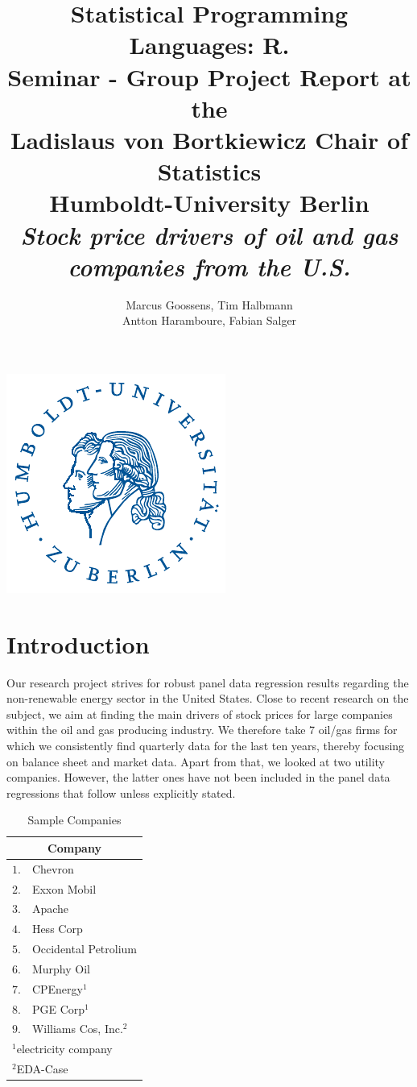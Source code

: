 \documentclass[a4paper]{article}
\title{Statistical Programming Languages: R. \\ Seminar - Group Project Report at the \\
Ladislaus von Bortkiewicz Chair of Statistics \\
Humboldt-University Berlin \\ \emph{Stock price drivers of oil and gas companies from the U.S.}}
\author{Marcus Goossens, Tim Halbmann \\ Antton Haramboure, Fabian Salger}
\begin{document}
\maketitle

\begin{center}
\includegraphics{hulogo.pdf}\\[0.75cm]
\end{center}

\newpage

\tableofcontents

\newpage

\section{Introduction}

Our research project strives for robust panel data regression results regarding the non-renewable energy sector in the United States. Close to recent research on the subject, we aim at finding the main drivers of stock prices for large companies within the oil and gas producing industry. We therefore take 7 oil/gas firms for which we consistently find quarterly data for the last ten years, thereby focusing on balance sheet and market data. Apart from that, we looked at two utility companies. However, the latter ones have not been included in the panel data regressions that follow unless explicitly stated.

\begin{table}[ht]
\centering
\begin{tabular}{rl}
\hline
\hline
\multicolumn{2}{c}{Company}\\
\hline
$1.$ & Chevron  \\ 
$2.$ & Exxon Mobil  \\ 
$3.$ & Apache  \\ 
$4.$ & Hess Corp \\ 
$5.$ & Occidental Petrolium  \\ 
$6.$ & Murphy Oil  \\
$7.$ & CPEnergy$^{1}$ \\
$8.$ & PGE Corp$^{1}$ \\
$9.$ & Williams Cos, Inc.$^{2}$ \\
\hline
\hline
\multicolumn{2}{l}{$^{1}$electricity company} \\
\multicolumn{2}{l}{$^{2}$EDA-Case}
\end{tabular}
\label{}
\caption{Sample Companies} 
\end{table}
\end{document}
